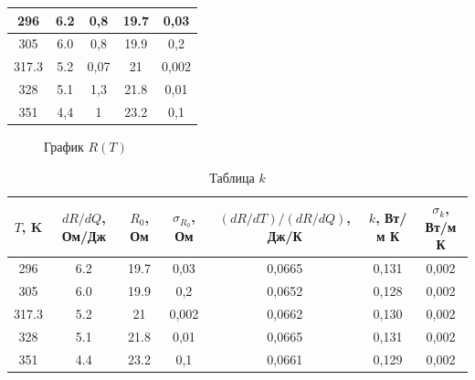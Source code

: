 \documentclass[a4paper, 12pt]{article}%
\begin{document}
\begin{enumerate}
\begin{table}[h]
\begin{tabular}{|c|c|c|c|c|}
296 & 6.2 & 0,8 & 19.7 & 0,03 \\ \hline
305 & 6.0 & 0,8 & 19.9 & 0,2 \\ \hline
317.3 & 5.2 & 0,07 & 21 & 0,002 \\ \hline
328 & 5.1 & 1,3 & 21.8 & 0,01 \\ \hline
351 & 4,4  & 1 & 23.2 & 0,1 \\ \hline
\end{tabular}
\end{table}
\FloatBarrier
\begin{figure}[h]
\caption{График $R(T)$}
\end{figure}
\FloatBarrier
\begin{table}[h]
\begin{tabular}{|c|c|c|c|c|c|c|}
\hline
$T$, K & $dR/dQ$, Ом/Дж & $R_0$, Ом & $\sigma_{R_0}$, Ом & $(dR/dT)/(dR/dQ)$, Дж/К & $k$, Вт/м К & $\sigma_k$, Вт/м К \\ \hline
296   & 6.2 & 19.7 & 0,03 & 0,0665 & 0,131 & 0,002 \\ \hline
305   & 6.0 & 19.9  & 0,2 & 0,0652 & 0,128 & 0,002 \\ \hline
317.3 & 5.2 & 21 & 0,002  & 0,0662 & 0,130 & 0,002 \\ \hline
328   & 5.1 & 21.8 & 0,01 & 0,0665 & 0,131 & 0,002 \\ \hline
351   & 4.4 & 23.2  & 0,1 & 0,0661 & 0,129 & 0,002 \\ \hline
\end{tabular}
\caption{Таблица $k$}
\end{table}
\end{enumerate}
\end{document}
